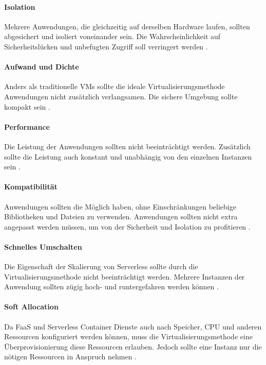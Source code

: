 \paragraph{Isolation} Mehrere Anwendungen, die gleichzeitig
auf derselben Hardware laufen, sollten abgesichert und
isoliert voneinander sein. Die Wahrscheinlichkeit auf
Sicherheitslücken und unbefugten Zugriff soll verringert werden
\cite{Firecracker}.

\paragraph{Aufwand und Dichte} Anders als traditionelle VMs
sollte die ideale Virtualisierungsmethode Anwendungen
nicht zusätzlich verlangsamen. Die sichere Umgebung sollte
kompakt sein \cite{Firecracker}.

\paragraph{Performance} Die Leistung der Anwendungen sollten
nicht beeinträchtigt werden. Zusätzlich sollte die Leistung auch 
konstant und unabhängig von den einzelnen Instanzen sein
\cite{Firecracker}.

\paragraph{Kompatibilität} Anwendungen sollten die Möglich haben,
ohne Einschränkungen beliebige Bibliotheken und Dateien zu
verwenden. Anwendungen sollten nicht extra angepasst werden
müssen, um von der Sicherheit und Isolation zu profitieren
\cite{Firecracker}.

\paragraph{Schnelles Umschalten} Die Eigenschaft der Skalierung von
Serverless sollte durch die Virtualisierungsmethode nicht
beeinträchtigt werden. Mehrere Instanzen der Anwendung sollten
zügig hoch- und runtergefahren werden können \cite{Firecracker}.

\paragraph{Soft Allocation} Da FaaS und Serverless
Container Dienste auch nach Speicher,
CPU und anderen Ressourcen konfiguriert
werden können, muss die Virtualisierungsmethode eine
Überprovisionierung diese Ressourcen erlauben. Jedoch sollte
eine Instanz nur die nötigen Ressourcen in Anspruch nehmen
\cite{Firecracker}.


